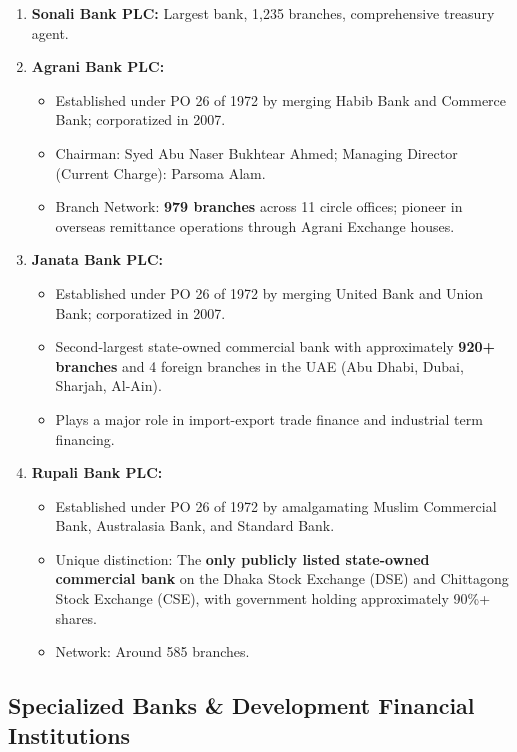 \begin{enumerate}
  \item \textbf{Sonali Bank PLC:} Largest bank, 1,235 branches, comprehensive treasury agent.
  \item \textbf{Agrani Bank PLC:}
  \begin{itemize}
    \item Established under PO 26 of 1972 by merging Habib Bank and Commerce Bank; corporatized in 2007.
    \item Chairman: Syed Abu Naser Bukhtear Ahmed; Managing Director (Current Charge): Parsoma Alam.
    \item Branch Network: \textbf{979 branches} across 11 circle offices; pioneer in overseas remittance operations through Agrani Exchange houses.
  \end{itemize}
  \item \textbf{Janata Bank PLC:}
  \begin{itemize}
    \item Established under PO 26 of 1972 by merging United Bank and Union Bank; corporatized in 2007.
    \item Second-largest state-owned commercial bank with approximately \textbf{920+ branches} and 4 foreign branches in the UAE (Abu Dhabi, Dubai, Sharjah, Al-Ain).
    \item Plays a major role in import-export trade finance and industrial term financing.
  \end{itemize}
  \item \textbf{Rupali Bank PLC:}
  \begin{itemize}
    \item Established under PO 26 of 1972 by amalgamating Muslim Commercial Bank, Australasia Bank, and Standard Bank.
    \item Unique distinction: The \textbf{only publicly listed state-owned commercial bank} on the Dhaka Stock Exchange (DSE) and Chittagong Stock Exchange (CSE), with government holding approximately 90\%+ shares.
    \item Network: Around 585 branches.
  \end{itemize}
\end{enumerate}

\medskip

\subsection{Specialized Banks \& Development Financial Institutions}

